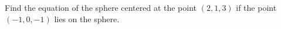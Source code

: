 \begin{activity} \label{A:9.1.5}
    Find the equation of the sphere centered at the point $(2,1,3)$ if the point $(-1,0,-1)$ lies on the sphere.

\end{activity}
\begin{smallhint}

\end{smallhint}
\begin{bighint}

\end{bighint}
\begin{activitySolution}

\end{activitySolution}
\aftera 